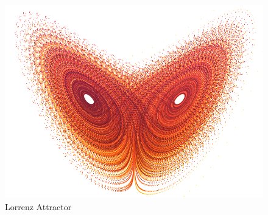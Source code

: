 
\maketitle


\begin{figure}[h]
	
	\includegraphics[width=1.1\linewidth]{lorenzattractor}
	\caption{Lorrenz Attractor}
	\label{fig:waveinterference}
\end{figure}